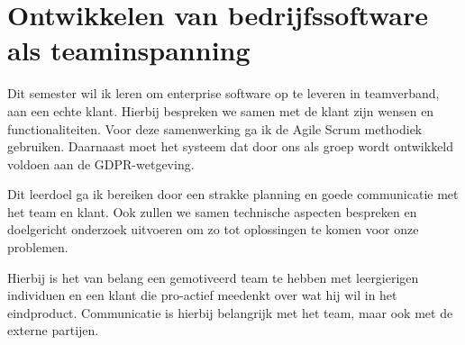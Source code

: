 

\section{Ontwikkelen van bedrijfssoftware als teaminspanning}\label{sec:ontwikkelen-van-bedrijfssoftware-als-teaminspanning}



	Dit semester wil ik leren om enterprise software op te leveren in teamverband, aan een echte klant.
	Hierbij bespreken we samen met de klant zijn wensen en functionaliteiten.
	Voor deze samenwerking ga ik de Agile Scrum methodiek gebruiken.
	Daarnaast moet het systeem dat door ons als groep wordt ontwikkeld voldoen aan de GDPR-wetgeving.


	Dit leerdoel ga ik bereiken door een strakke planning en goede communicatie met het team en klant.
	Ook zullen we samen technische aspecten bespreken en doelgericht onderzoek uitvoeren om zo tot oplossingen te komen
	voor onze problemen.


	Hierbij is het van belang een gemotiveerd team te hebben met leergierigen individuen en een klant die pro-actief
	meedenkt over wat hij wil in het eindproduct.
	Communicatie is hierbij belangrijk met het team, maar ook met de externe partijen.


